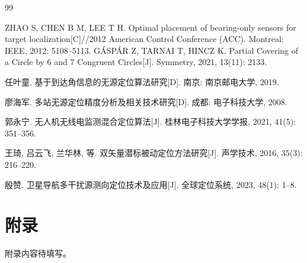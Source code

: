 \documentclass[UTF8, zihao=5,AutoFakeBold=2]{ctexart}
\begin{document}
\newpage
\begin{thebibliography}{99}
    
	 ZHAO S, CHEN B M, LEE T H. Optimal placement of bearing-only sensors for target localization[C]//2012 American Control Conference (ACC). Montreal: IEEE, 2012: 5108--5113.
     GÁSPÁR Z, TARNAI T, HINCZ K. Partial Covering of a Circle by 6 and 7 Congruent Circles[J]. Symmetry, 2021, 13(11): 2133.

	 任叶童. 基于到达角信息的无源定位算法研究[D]. 南京: 南京邮电大学, 2019.

	 廖海军. 多站无源定位精度分析及相关技术研究[D]. 成都: 电子科技大学, 2008.

	 郭永宁. 无人机无线电监测混合定位算法[J]. 桂林电子科技大学学报, 2021, 41(5): 351--356.

	 王琦, 吕云飞, 兰华林, 等. 双矢量潜标被动定位方法研究[J]. 声学技术, 2016, 35(3): 216--220.

	 殷赞. 卫星导航多干扰源测向定位技术及应用[J]. 全球定位系统, 2023, 48(1): 1--8.

\end{thebibliography}

\section*{附录}

	附录内容待填写。
\end{document}

